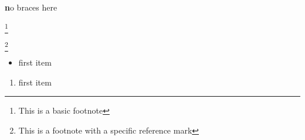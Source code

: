 \documentclass[12pt]{article}
\newcommand\"{quote}
\begin{document}
\textbf no braces here


\footnote{This is a basic footnote}

\footnote [ 5 ] {This is a footnote with a specific reference mark}


\footnotemark

\footnotemark  [ 1   ]


\begin{itemize}
\item first item
\end{itemize}

\begin{enumerate}
\item first item
\end{enumerate}
\end{document}
